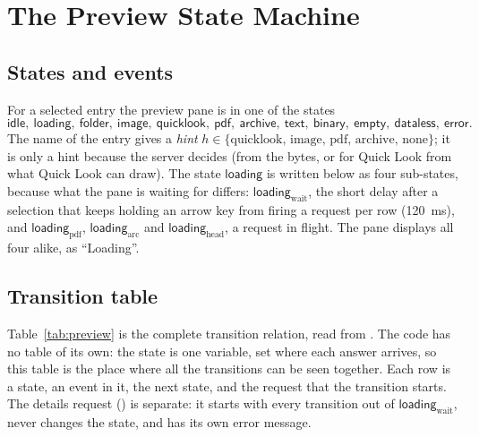 \section{The Preview State Machine}
\label{sec:state}

\subsection{States and events}

For a selected entry the preview pane is in one of the states
\[
  \mathsf{idle},\ \mathsf{loading},\ \mathsf{folder},\ \mathsf{image},\
  \mathsf{quicklook},\ \mathsf{pdf},\ \mathsf{archive},\ \mathsf{text},\ \mathsf{binary},\
  \mathsf{empty},\ \mathsf{dataless},\ \mathsf{error}.
\]
The name of the entry gives a \emph{hint} $h\in\{\text{quicklook, image, pdf,
archive, none}\}$; it is only a hint because the server decides (from the bytes,
or for Quick Look from what Quick Look can draw).  The state $\mathsf{loading}$ is
written below as four sub-states, because what the pane is waiting for differs:
$\mathsf{loading}_{\mathrm{wait}}$, the short delay after a selection that keeps
holding an arrow key from firing a request per row (120~ms), and
$\mathsf{loading}_{\mathrm{pdf}}$, $\mathsf{loading}_{\mathrm{arc}}$ and
$\mathsf{loading}_{\mathrm{head}}$, a request in flight.  The pane displays all four
alike, as ``Loading''.

\subsection{Transition table}
\label{sec:state-table}

Table~\ref{tab:preview} is the complete transition relation, read from
.  The code has no table of its own: the state is
one variable, set where each answer arrives, so this table is the place where all
the transitions can be seen together.  Each row is a state, an event in it, the
next state, and the request that the transition starts.  The details request
(\code{api/meta}) is separate: it starts with every transition out of
$\mathsf{loading}_{\mathrm{wait}}$, never changes the state, and has its own error
message.

